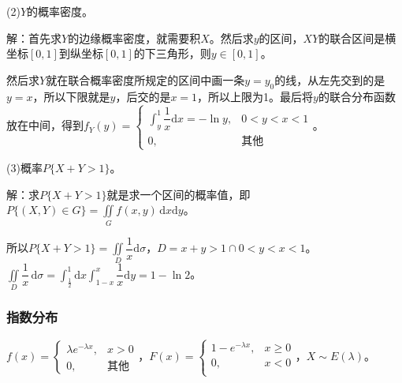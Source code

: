 (2)$Y$的概率密度。

解：首先求$Y$的边缘概率密度，就需要积$X$。然后求$y$的区间，$XY$的联合区间是横坐标$[0,1]$到纵坐标$[0,1]$的下三角形，则$y\in[0,1]$。

然后求$Y$就在联合概率密度所规定的区间中画一条$y=y_0$的线，从左先交到的是$y=x$，所以下限就是$y$，后交的是$x=1$，所以上限为1。最后将$y$的联合分布函数放在中间，得到$f_Y(y)=\left\{\begin{array}{ll}
    \displaystyle{\int_y^1\dfrac{1}{x}\textrm{d}x}=-\ln y, & 0<y<x<1 \\
    0, & \text{其他}
\end{array}\right.$。

(3)概率$P\{X+Y>1\}$。

解：求$P\{X+Y>1\}$就是求一个区间的概率值，即$P\{(X,Y)\in G\}=\iint\limits_Gf(x,y)\,\textrm{d}x\textrm{d}y$。

\begin{multicols}{2}
    

    所以$P\{X+Y>1\}=\iint\limits_D\dfrac{1}{x}\textrm{d}\sigma$，$D=x+y>1\cap0<y<x<1$。$\iint\limits_D\dfrac{1}{x}\,\textrm{d}\sigma=\int_\frac{1}{2}^1\textrm{d}x\int_{1-x}^x\dfrac{1}{x}\textrm{d}y=1-\ln2$。

\end{multicols}

\subsubsection{指数分布}

$f(x)=\left\{\begin{array}{ll}
    \lambda e^{-\lambda x}, & x>0 \\
    0, & \text{其他}
\end{array}\right.$，$F(x)=\left\{\begin{array}{ll}
    1-e^{-\lambda x}, & x\geqslant0 \\
    0, & x<0 \\
\end{array}\right.$，$X\sim E(\lambda)$。


